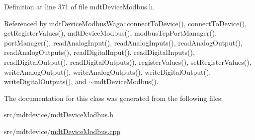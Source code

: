 Definition at line 371 of file mdt\-Device\-Modbus.\-h.



Referenced by mdt\-Device\-Modbus\-Wago\-::connect\-To\-Device(), connect\-To\-Device(), get\-Register\-Values(), mdt\-Device\-Modbus(), modbus\-Tcp\-Port\-Manager(), port\-Manager(), read\-Analog\-Input(), read\-Analog\-Inputs(), read\-Analog\-Output(), read\-Analog\-Outputs(), read\-Digital\-Input(), read\-Digital\-Inputs(), read\-Digital\-Output(), read\-Digital\-Outputs(), register\-Values(), set\-Register\-Values(), write\-Analog\-Output(), write\-Analog\-Outputs(), write\-Digital\-Output(), write\-Digital\-Outputs(), and $\sim$mdt\-Device\-Modbus().



The documentation for this class was generated from the following files\-:\begin{DoxyCompactItemize}
\item 
src/mdtdevice/\hyperlink{mdt_device_modbus_8h}{mdt\-Device\-Modbus.\-h}\item 
src/mdtdevice/\hyperlink{mdt_device_modbus_8cpp}{mdt\-Device\-Modbus.\-cpp}\end{DoxyCompactItemize}
